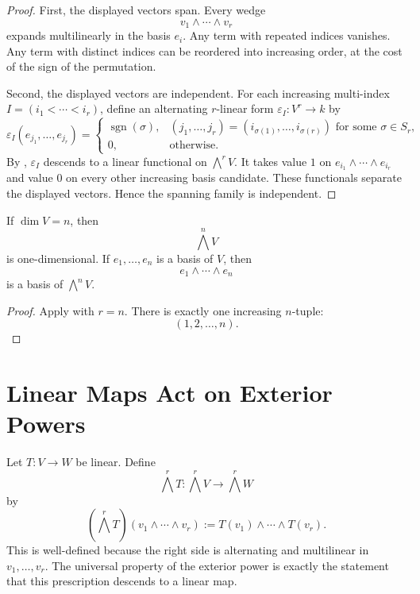 \documentclass[11pt]{memoir}
\begin{document}
\begin{proof}
First, the displayed vectors span. Every wedge
\[
  v_1\wedge\cdots\wedge v_r
\]
expands multilinearly in the basis \(e_i\). Any term with repeated
indices vanishes. Any term with distinct indices can be reordered
into increasing order, at the cost of the sign of the permutation.

Second, the displayed vectors are independent. For each increasing
multi-index \(I=(i_1<\cdots<i_r)\), define an alternating \(r\)-linear
form \(\varepsilon_I:V^r\to k\) by
\[
  \varepsilon_I(e_{j_1},\dots,e_{j_r})
  =
  \begin{cases}
    \operatorname{sgn}(\sigma),&
    (j_1,\dots,j_r)=(i_{\sigma(1)},\dots,i_{\sigma(r)})
    \text{ for some }\sigma\in S_r,\\
    0,&\text{otherwise.}
  \end{cases}
\]
By , \(\varepsilon_I\) descends to a
linear functional on \(\bigwedge^rV\). It takes value \(1\) on
\(e_{i_1}\wedge\cdots\wedge e_{i_r}\) and value \(0\) on every other
increasing basis candidate. These functionals separate the displayed
vectors. Hence the spanning family is independent.
\end{proof}

\begin{corollary}
\label{cor:top-wedge-line}
If \(\dim V=n\), then
\[
  \bigwedge^nV
\]
is one-dimensional. If \(e_1,\dots,e_n\) is a basis of \(V\), then
\[
  e_1\wedge\cdots\wedge e_n
\]
is a basis of \(\bigwedge^nV\).
\end{corollary}

\begin{proof}
Apply  with \(r=n\). There is exactly one
increasing \(n\)-tuple:
\[
  (1,2,\dots,n).
\]
\end{proof}

\section{Linear Maps Act on Exterior Powers}
\label{sec:linear-maps-exterior}

Let \(T:V\to W\) be linear. Define
\[
  \bigwedge^rT:\bigwedge^rV\to\bigwedge^rW
\]
by
\[
  (\bigwedge^rT)(v_1\wedge\cdots\wedge v_r)
  :=
  T(v_1)\wedge\cdots\wedge T(v_r).
\]
This is well-defined because the right side is alternating and
multilinear in \(v_1,\dots,v_r\). The universal property of the
exterior power is exactly the statement that this prescription
descends to a linear map.
\end{document}
